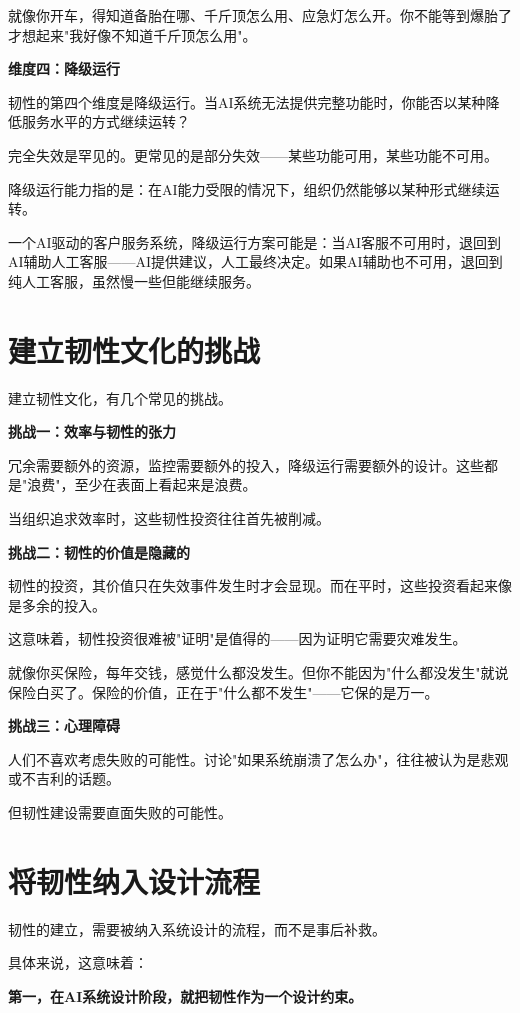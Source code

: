 就像你开车，得知道备胎在哪、千斤顶怎么用、应急灯怎么开。你不能等到爆胎了才想起来"我好像不知道千斤顶怎么用"。

\textbf{维度四：降级运行}

韧性的第四个维度是降级运行。当AI系统无法提供完整功能时，你能否以某种降低服务水平的方式继续运转？

完全失效是罕见的。更常见的是部分失效——某些功能可用，某些功能不可用。

降级运行能力指的是：在AI能力受限的情况下，组织仍然能够以某种形式继续运转。

一个AI驱动的客户服务系统，降级运行方案可能是：当AI客服不可用时，退回到AI辅助人工客服——AI提供建议，人工最终决定。如果AI辅助也不可用，退回到纯人工客服，虽然慢一些但能继续服务。

\section{建立韧性文化的挑战}


建立韧性文化，有几个常见的挑战。

\textbf{挑战一：效率与韧性的张力}

冗余需要额外的资源，监控需要额外的投入，降级运行需要额外的设计。这些都是"浪费"，至少在表面上看起来是浪费。

当组织追求效率时，这些韧性投资往往首先被削减。

\textbf{挑战二：韧性的价值是隐藏的}

韧性的投资，其价值只在失效事件发生时才会显现。而在平时，这些投资看起来像是多余的投入。

这意味着，韧性投资很难被"证明"是值得的——因为证明它需要灾难发生。

就像你买保险，每年交钱，感觉什么都没发生。但你不能因为"什么都没发生"就说保险白买了。保险的价值，正在于"什么都不发生"——它保的是万一。

\textbf{挑战三：心理障碍}

人们不喜欢考虑失败的可能性。讨论"如果系统崩溃了怎么办"，往往被认为是悲观或不吉利的话题。

但韧性建设需要直面失败的可能性。

\section{将韧性纳入设计流程}


韧性的建立，需要被纳入系统设计的流程，而不是事后补救。

具体来说，这意味着：

\textbf{第一，在AI系统设计阶段，就把韧性作为一个设计约束。}

